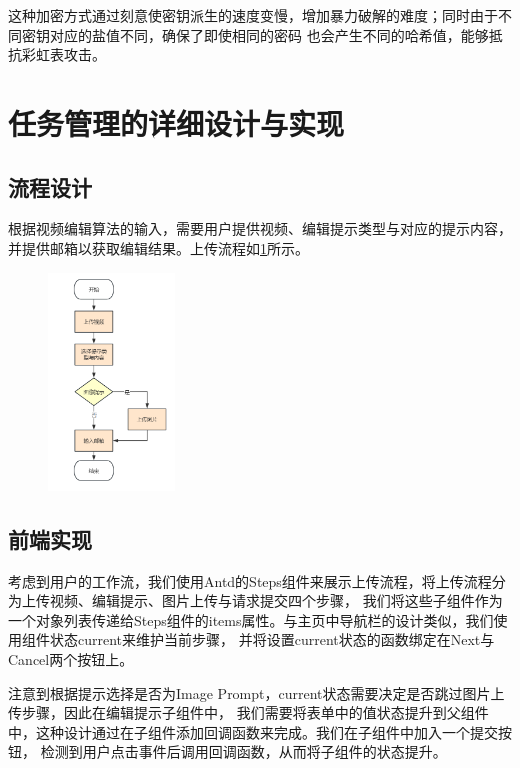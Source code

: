 这种加密方式通过刻意使密钥派生的速度变慢，增加暴力破解的难度；同时由于不同密钥对应的盐值不同，确保了即使相同的密码
也会产生不同的哈希值，能够抵抗彩虹表攻击。

\section{任务管理的详细设计与实现}

\subsection{流程设计}

根据视频编辑算法的输入，需要用户提供视频、编辑提示类型与对应的提示内容，并提供邮箱以获取编辑结果。上传流程如\ref{fig:upload-process}所示。
\begin{figure}[ht]
    \centering
    \includegraphics[width=0.3\textwidth]{source/img/edit_process.png}
    \label{fig:upload-process}
\end{figure}

\subsection{前端实现}

考虑到用户的工作流，我们使用Antd的Steps组件来展示上传流程，将上传流程分为上传视频、编辑提示、图片上传与请求提交四个步骤，
我们将这些子组件作为一个对象列表传递给Steps组件的items属性。与主页中导航栏的设计类似，我们使用组件状态current来维护当前步骤，
并将设置current状态的函数绑定在Next与Cancel两个按钮上。

注意到根据提示选择是否为Image Prompt，current状态需要决定是否跳过图片上传步骤，因此在编辑提示子组件中，
我们需要将表单中的值状态提升到父组件中，这种设计通过在子组件添加回调函数来完成。我们在子组件中加入一个提交按钮，
检测到用户点击事件后调用回调函数，从而将子组件的状态提升。

